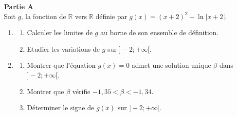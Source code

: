 \documentclass[12pt,a4paper]{article}
\begin{document}
\noindent \underline{\textbf{Partie A}} \\
Soit $g$, la fonction de $\mathbb{R}$ vers $\mathbb{R}$ définie par $g(x) = (x+2)^2 + \ln|x+2|$.
\begin{enumerate}
    \item \begin{enumerate}
        \item Calculer les limites de $g$ au borne de son ensemble de définition.
        \item Etudier les variations de $g$ sur $]-2; +\infty[$.
    \end{enumerate}
    \item \begin{enumerate}
        \item Montrer que l'équation $g(x) = 0$ admet une solution unique $\beta$ dans $]-2; +\infty[$.
        \item Montrer que $\beta$ vérifie $-1,35 < \beta < -1,34$.
        \item Déterminer le signe de $g(x)$ sur $]-2; +\infty[$.
    \end{enumerate}
\end{enumerate}

\vspace{0.5cm}
\end{document}
